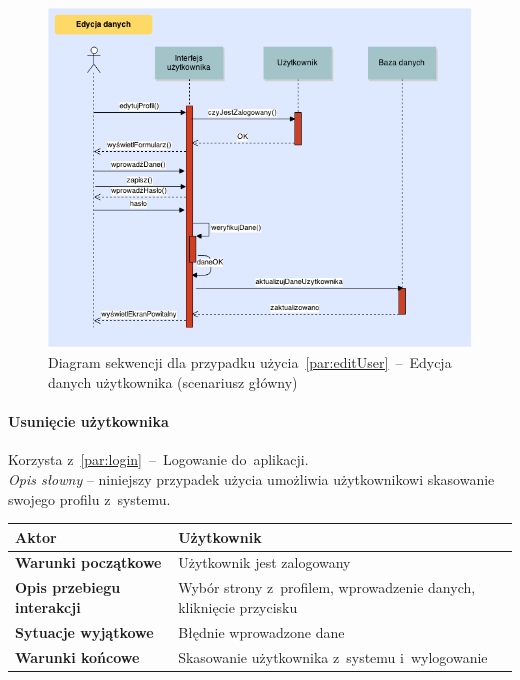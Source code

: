 \begin{figure}[H]
  \includegraphics[width=\textwidth]{images/edytuj_uzytkownika.png}
  \caption{Diagram sekwencji dla przypadku użycia~\ref{par:editUser}~--~Edycja danych użytkownika (scenariusz główny)}
\end{figure}

\newpage
\paragraph{Usunięcie użytkownika\newline}
\label{par:deleteUser}
Korzysta z~\ref{par:login}~--~Logowanie do~aplikacji.\\

\textit{Opis słowny} -- niniejszy przypadek użycia umożliwia użytkownikowi skasowanie swojego profilu z~systemu.

\begin{longtable}{|p{5cm}|p{7cm}|}
  \hline \textbf{Aktor} & Użytkownik \\ \hline
  \textbf{Warunki początkowe} & Użytkownik jest zalogowany \\ \hline
  \textbf{Opis przebiegu interakcji} & Wybór strony z~profilem, wprowadzenie danych, kliknięcie przycisku \\ \hline
  \textbf{Sytuacje wyjątkowe} & Błędnie wprowadzone dane \\ \hline
  \textbf{Warunki końcowe} & Skasowanie użytkownika z~systemu i~wylogowanie \\ \hline
\end{longtable}

